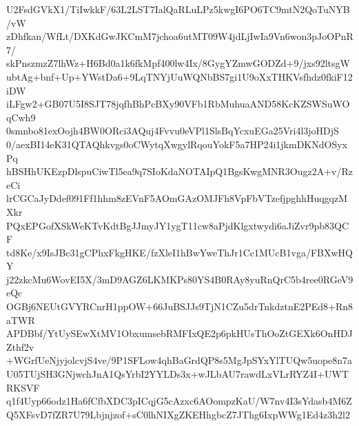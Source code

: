 U2FsdGVkX1/TiIwkkF/63L2LST7IalQaRLuLPz5kwgI6PO6TC9mtN2QoTuNYB/vW
zDhfkan/WfLt/DXKdGwJKCmM7jchoa6utMT09W4jdLjIwIa9Vn6won3pJoOPnR7/
skPnszmzZ7lhWz+H6Bd0a1k6fkMpf400lw4Ix/8GygYZmwGODZd+9/jxs92ltsgW
ubtAg+bnf+Up+YWstDa6+9LqTNYjUuWQNbBS7gi1U9oXxTHKVsfhdz0fkiF12iDW
iLFgw2+GB07U5I8SJT78jqfhBhPcBXy90VFb1RbMuhuaAND58KcKZSWSuWOqCwh9
0smnbo81exOojh4BW0ORci3AQuj4Fvvu0eVPl1SlsBqYcxuEGa25Vri4l3joHDjS
0/aexBI14eK31QTAQhkvgs0oCWytqXwgylRqouYokF5a7HP24i1jkmDKNdOSyxPq
hBSHhUKEzpDlspuCiwTl5ea9q7SIoKdaNOTAIpQ1BgsKwgMNR3Ougz2A+v/RzeCi
lrCGCaJyDdef091Ff1hhm8zEVnF5AOmGAzOMJFh8VpFbVTzefjpghhHuqgqzMXkr
PQxEPGofXSkWeKTvKdtBgJJmyJY1ygT11cw8aPjdKlgxtwydi6aJiZvr9pb83QCF
td8Ke/x9IsJBc31gCPhxFkgHKE/fzXleI1hBwYweThJr1Cc1MUcB1vga/FBXwHQY
j22zkcMu6WovEI5X/3mD9AGZ6LKMKPs80YS4B0RAy8yuRnQrC5b4ree0RGeV9eQc
OGBj6NEUtGVYRCnrH1ppOW+66JuBSJJs9TjN1CZu5drTnkdztnE2PEd8+Rn8aTWR
APDBbf/YtUySEwXtMV1ObxumsebRMFIxQE2p6pkHUsThOoZtGEXk6OnHDJZthf2v
+WGrfUeNjyjolcvjS4ve/9P1SFLow4qhBaGrdQP8s5MgJpSYxYlTUQw5uope8n7a
U05TUjSH3GNjwchJnA1QsYrbI2YYLDs3x+wJLbAU7rawdLxVLrRYZ4I+UWTRKSVF
q1f4Uyp66odz1Ha6fCfbXDC3pICqjG5cAzxc6AOompzKaU/W7nv4I3sYdasb4M6Z
Q5XFsvD7fZR7U79Lbjnjzof+sC0lhNIXgZKEHhgbcZ7JThg6IxpWWg1Ed4z3h2l2
